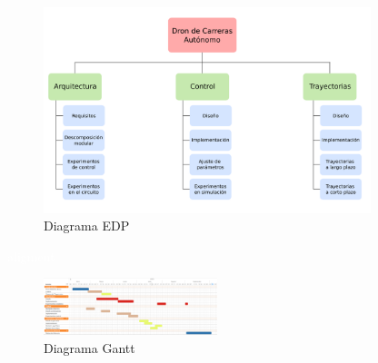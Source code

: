 \vspace{0.5cm}
\begin{figure}[htb!]
	\centering
	\includegraphics[width=0.85\textwidth]{imagenes/EDP}
	\caption{Diagrama EDP}
	\label{edp}
\end{figure}

\newpage

\textcolor{white}{aligment}
\begin{figure}[htb!]
	\centering
	\includegraphics[angle=90,width =0.45\textwidth]{imagenes/gantt}
	\caption{Diagrama Gantt}
	\label{gantt}
\end{figure}

